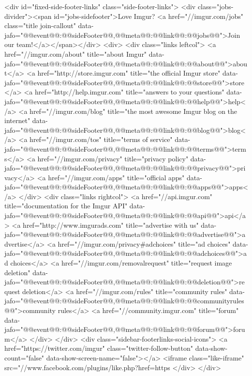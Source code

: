                             <div id="fixed-side-footer-links" class="side-footer-links">
    <div class="jobs-divider"><span id="jobs-sidefooter">Love Imgur? <a href="//imgur.com/jobs" class="title join-callout" data-jafo="{@@event@@:@@sideFooter@@,@@meta@@:{@@link@@:@@jobs@@}}">Join our team!</a></span></div>
    <div>
        <div class="links leftcol">
            <a href="//imgur.com/about" title="about Imgur" data-jafo="{@@event@@:@@sideFooter@@,@@meta@@:{@@link@@:@@about@@}}">about</a>
            <a href="http://store.imgur.com" title="the official Imgur store" data-jafo="{@@event@@:@@sideFooter@@,@@meta@@:{@@link@@:@@store@@}}">store</a>
            <a href="http://help.imgur.com" title="answers to your questions" data-jafo="{@@event@@:@@sideFooter@@,@@meta@@:{@@link@@:@@help@@}}">help</a>
            <a href="//imgur.com/blog" title="the most awesome Imgur blog on the internet" data-jafo="{@@event@@:@@sideFooter@@,@@meta@@:{@@link@@:@@blog@@}}">blog</a>
            <a href="//imgur.com/tos" title="terms of service" data-jafo="{@@event@@:@@sideFooter@@,@@meta@@:{@@link@@:@@terms@@}}">terms</a>
            <a href="//imgur.com/privacy" title="privacy policy" data-jafo="{@@event@@:@@sideFooter@@,@@meta@@:{@@link@@:@@privacy@@}}">privacy</a>
            <a href="//imgur.com/apps" title="official apps" data-jafo="{@@event@@:@@sideFooter@@,@@meta@@:{@@link@@:@@apps@@}}">apps</a>
        </div>
        <div class="links rightcol">
            <a href="//api.imgur.com" title="documentation for the Imgur API" data-jafo="{@@event@@:@@sideFooter@@,@@meta@@:{@@link@@:@@api@@}}">api</a>
            <a href="http://www.imgurads.com" title="advertise with us" data-jafo="{@@event@@:@@sideFooter@@,@@meta@@:{@@link@@:@@advertise@@}}">advertise</a>
            <a href="//imgur.com/privacy#adchoices" title="ad choices" data-jafo="{@@event@@:@@sideFooter@@,@@meta@@:{@@link@@:@@adchoices@@}}">ad choices</a>
            <a href="//imgur.com/removalrequest" title="request image deletion" data-jafo="{@@event@@:@@sideFooter@@,@@meta@@:{@@link@@:@@deletion@@}}">request deletion</a>
            <a href="//imgur.com/rules" title="community rules" data-jafo="{@@event@@:@@sideFooter@@,@@meta@@:{@@link@@:@@communityrules@@}}">community rules</a>
            <a href="//community.imgur.com" title="forum" data-jafo="{@@event@@:@@sideFooter@@,@@meta@@:{@@link@@:@@forum@@}}">forum</a>
        </div>
    </div>
    <div class="sidebar-footerlinks-social-icons">
        <a href="https://twitter.com/imgur" class="twitter-follow-button" data-show-count="false" data-show-screen-name="false"></a>
        <iframe class="like-iframe" src="//www.facebook.com/plugins/like.php?href=https%
    </div>
</div>

